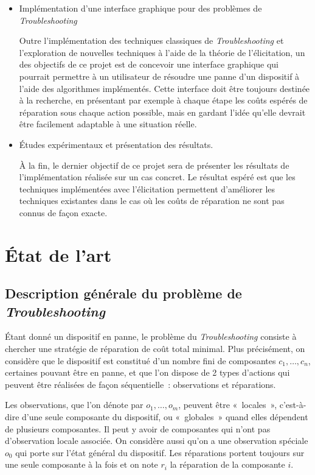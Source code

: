 \documentclass[a4paper,11pt]{article}
\theoremstyle{plain}
\theoremstyle{definition}
\begin{document}
\begin{itemize}
\item Implémentation d'une interface graphique pour des problèmes de \emph{Troubleshooting}

Outre l'implémentation des techniques classiques de \emph{Troubleshooting} et l'exploration de nouvelles techniques à l'aide de la théorie de l'élicitation, un des objectifs de ce projet est de concevoir une interface graphique qui pourrait permettre à un utilisateur de résoudre une panne d'un dispositif à l'aide des algorithmes implémentés. Cette interface doit être toujours destinée à la recherche, en présentant par exemple à chaque étape les coûts espérés de réparation sous chaque action possible, mais en gardant l'idée qu'elle devrait être facilement adaptable à une situation réelle.

\item Études expérimentaux et présentation des résultats.

À la fin, le dernier objectif de ce projet sera de présenter les résultats de l'implémentation réalisée sur un cas concret.  Le résultat espéré est que les techniques implémentées avec l'élicitation permettent d'améliorer les techniques existantes dans le cas où les coûts de réparation ne sont pas connus de façon exacte.

\end{itemize}

\section{État de l'art}
\label{SecEtatDeLArt}

\subsection{Description générale du problème de \emph{Troubleshooting}}
\label{SecDescription}

Étant donné un dispositif en panne, le problème du \emph{Troubleshooting} consiste à chercher une stratégie de réparation de coût total minimal. Plus précisément, on considère que le dispositif est constitué d'un nombre fini de composantes $c_1, \dotsc, c_n$, certaines pouvant être en panne, et que l'on dispose de 2 types d'actions qui peuvent être réalisées de façon séquentielle~: observations et réparations.

Les observations, que l'on dénote par $o_1, \dotsc, o_m$,  peuvent être «~locales~», c'est-à-dire d'une seule composante du dispositif, ou «~globales~» quand elles dépendent de plusieurs composantes. Il peut y avoir de composantes qui n'ont pas d'observation locale associée. On considère aussi qu'on a une observation spéciale $o_0$ qui porte sur l'état général du dispositif. Les réparations portent toujours sur une seule composante à la fois et on note $r_i$ la réparation de la composante $i$. 
\end{document}

